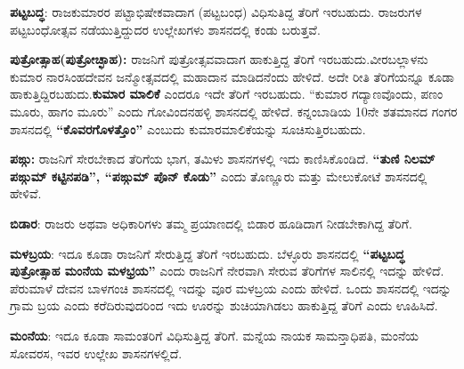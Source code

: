 \vskip 3pt

\textbf{ಪಟ್ಟಬದ್ಧ}: ರಾಜಕುಮಾರರ ಪಟ್ಟಾಭಿಷೇಕವಾದಾಗ (ಪಟ್ಟಬಂಧ) ವಿಧಿಸುತಿದ್ದ ತೆರಿಗೆ ಇರಬಹುದು. ರಾಜರುಗಳ ಪಟ್ಟಬಂಧೋತ್ಸವ ನಡೆಯುತ್ತಿದ್ದುದರ ಉಲ್ಲೇಖಗಳು ಶಾಸನದಲ್ಲಿ ಕಂಡು ಬರುತ್ತವೆ.

\vskip 3pt

\textbf{ಪುತ್ರೋತ್ಸಾಹ}\textbf{(ಪುತ್ರೋಚ್ಛಾಹ):} ರಾಜನಿಗೆ ಪುತ್ರೋತ್ಸವವಾದಾಗ ಹಾಕುತ್ತಿದ್ದ ತೆರಿಗೆ ಇರಬಹುದು.\break ವೀರಬಲ್ಲಾಳನು ಕುಮಾರ ನಾರಸಿಂಹದೇವನ ಜನ್ಮೋತ್ಸವದಲ್ಲಿ ಮಹಾದಾನ ಮಾಡಿದನೆಂದು ಹೇಳಿದೆ. ಅದೇ ರೀತಿ ತೆರಿಗೆಯನ್ನೂ ಕೂಡಾ ಹಾಕುತ್ತಿದ್ದಿರಬಹುದು.\textbf{ಕುಮಾರ ಮಾಲಿಕೆ} ಎಂದರೂ ಇದೇ ತೆರಿಗೆ ಇರಬಹುದು. “ಕುಮಾರ ಗದ್ಯಾಣವೊಂದು, ಪಣಂ ಮೂರು, ಹಾಗಂ ಮೂರು” ಎಂದು ಗೋವಿಂದನಹಳ್ಳಿ ಶಾಸನದಲ್ಲಿ ಹೇಳಿದೆ. ಕನ್ನಂಬಾಡಿಯ 10ನೇ ಶತಮಾನದ ಗಂಗರ ಶಾಸನದಲ್ಲಿ \textbf{“ಕೊವರಗೊಳತ್ತೊಂ”} ಎಂಬುದು ಕುಮಾರಮಾಲಿಕೆಯನ್ನು ಸೂಚಿಸುತ್ತಿರಬಹುದು.

\textbf{ಪಙ್ಗು:} ರಾಜನಿಗೆ ಸೇರಬೇಕಾದ ತೆರಿಗೆಯ ಭಾಗ, ತಮಿಳು ಶಾಸನಗಳಲ್ಲಿ ಇದು ಕಾಣಿಸಿಕೊಂಡಿದೆ. \textbf{“ತುಣಿ ನಿಲಮ್ ಪಙ್ಗುಮ್ ಕಟ್ಟಿನಪಡಿ”, “ಪಙ್ಗುಮ್ ಪೊನ್​ ಕೊಡು”} ಎಂದು ತೊಣ್ಣೂರು ಮತ್ತು ಮೇಲುಕೋಟೆ ಶಾಸನದಲ್ಲಿ ಹೇಳಿವೆ.

\textbf{ಬಿಡಾರ}: ರಾಜರು ಅಥವಾ ಅಧಿಕಾರಿಗಳು ತಮ್ಮ ಪ್ರಯಾಣದಲ್ಲಿ ಬಿಡಾರ ಹೂಡಿದಾಗ ನೀಡಬೇಕಾಗಿದ್ದ ತೆರಿಗೆ.

\textbf{ಮಳಬ್ರಯ}: ಇದೂ ಕೂಡಾ ರಾಜನಿಗೆ ಸೇರುತ್ತಿದ್ದ ತೆರಿಗೆ ಇರಬಹುದು. ಬೆಳ್ಳೂರು ಶಾಸನದಲ್ಲಿ \textbf{“ಪಟ್ಟಬದ್ಧ ಪುತ್ರೋತ್ಸಾಹ ಮಂನೆಯ ಮಳಭ್ರಯ”} ಎಂದು ರಾಜನಿಗೆ ನೇರವಾಗಿ ಸೇರುವ ತೆರಿಗೆಗಳ ಸಾಲಿನಲ್ಲಿ ಇದನ್ನು ಹೇಳಿದೆ. ಪೆರುಮಾಳೆ ದೇವನ ಬಾಳಗಂಚಿ ಶಾಸನದಲ್ಲಿ ಇದನ್ನು ವೂರ ಮಳಬ್ರಯ ಎಂದು ಹೇಳಿದೆ. ಒಂದು ಶಾಸನದಲ್ಲಿ ಇದನ್ನು ಗ್ರಾಮ ಬ್ರಯ ಎಂದು ಕರೆದಿರುವುದರಿಂದ ಇದು ಊರನ್ನು ಶುಚಿಯಾಗಿಡಲು ಹಾಕುತ್ತಿದ್ದ ತೆರಿಗೆ ಎಂದು ಊಹಿಸಿದೆ.

\textbf{ಮಂನೆಯ}: ಇದೂ ಕೂಡಾ ಸಾಮಂತರಿಗೆ ವಿಧಿಸುತ್ತಿದ್ದ ತೆರಿಗೆ. ಮನ್ನೆಯ ನಾಯಕ ಸಾಮನ್ತಾಧಿಪತಿ, ಮಂನೆಯ ಸೋವರಸ, ಇವರ ಉಲ್ಲೇಖ ಶಾಸನಗಳಲ್ಲಿದೆ.


